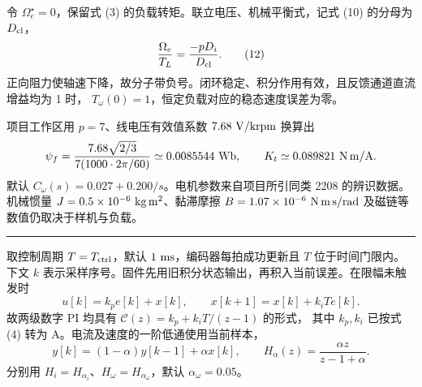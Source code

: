 \documentclass[UTF8,fontset=windows,11pt,a4paper]{ctexart}
\newcommand{\titleline}[1]{\noindent{\sffamily\bfseries\fontsize{20}{25}\selectfont #1}\par\vspace{.25em}\hrule\vspace{.45em}}
\newcommand{\subt}[1]{\par\vspace{.55em}{\sffamily\bfseries\large #1}\par\nobreak}
\newcommand{\Cw}{C_{\omega}}
\newcommand{\Hi}{H_i}
\newcommand{\Hw}{H_{\omega}}
\newcommand{\we}{\Omega_e}
\newcommand{\Wref}{\Omega_e^\star}
\newcommand{\Kt}{K_t}
\newcommand{\psiP}{\psi_f}
\begin{document}
\subt{负载扰动的符号与低频检查}
令 $\Wref=0$，保留式 (3) 的负载转矩。联立电压、机械平衡式，记式 (10) 的分母为 $D_{\rm cl}$，
\begin{equation}
 \frac{\we}{T_L}=\frac{-pD_i}{D_{\rm cl}} . \tag{12}
\end{equation}
正向阻力使轴速下降，故分子带负号。闭环稳定、积分作用有效，且反馈通道直流增益均为 1 时，
$T_\omega(0)=1$，恒定负载对应的稳态速度误差为零。

\subt{参数的物理含义}
项目工作区用 $p=7$、线电压有效值系数 $7.68~{\rm V/krpm}$ 换算出
\[
 \psiP=\frac{7.68\sqrt{2/3}}{7(1000\cdot 2\pi/60)}
 \simeq 0.0085544~{\rm Wb},\qquad
 \Kt\simeq 0.089821~{\rm N\,m/A}.
\]
默认 $\Cw(s)=0.027+0.200/s$。电机参数来自项目所引同类 2208 的辨识数据。
机械惯量 $J=0.5\times10^{-6}~{\rm kg\,m^2}$、黏滞摩擦 $B=1.07\times10^{-6}~{\rm N\,m\,s/rad}$
及磁链等数值仍取决于样机与负载。

\newpage
\titleline{4\quad 数字 PI、采样电机与编码器}
取控制周期 $T=T_{\rm ctrl}$，默认 $1~{\rm ms}$，编码器每拍成功更新且 $T$ 位于时间门限内。
下文 $k$ 表示采样序号。固件先用旧积分状态输出，再积入当前误差。在限幅未触发时
\[
 u[k]=k_p e[k]+x[k],\qquad x[k+1]=x[k]+k_iT e[k] .
\]
故两级数字 PI 均具有 $\mathcal C(z)=k_p+k_iT/(z-1)$ 的形式，
其中 $k_p,k_i$ 已按式 (4) 转为 A。电流及速度的一阶低通使用当前样本，
\begin{equation}
 y[k]=(1-\alpha)y[k-1]+\alpha x[k],\qquad
 H_\alpha(z)=\frac{\alpha z}{z-1+\alpha}.
 \tag{13}
\end{equation}
分别用 $\Hi=H_{\alpha_i}$、$\Hw=H_{\alpha_\omega}$，默认 $\alpha_\omega=0.05$。
\end{document}
